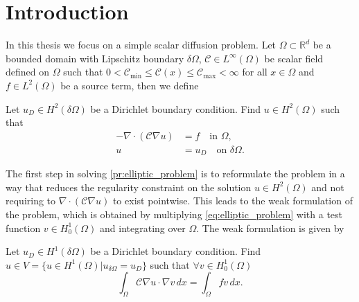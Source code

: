 \chapter{Introduction}\label{ch:introduction}
In this thesis we focus on a simple scalar diffusion problem. Let $\Omega\subset\mathbb{R}^d$ be a bounded domain with Lipschitz boundary $\delta\Omega$, $\mathcal{C}\in L^\infty(\Omega)$ be scalar field defined on $\Omega$ such that $0 < \mathcal{C}_{\min} \leq \mathcal{C}(x) \leq \mathcal{C}_{\max} < \infty$ for all $x\in\Omega$ and $f\in L^2(\Omega)$ be a source term, then we define
\begin{problem}
    Let $u_D\in H^2(\delta\Omega)$ be a Dirichlet boundary condition. Find $u\in H^2(\Omega)$ such that
    \begin{equation}
        \begin{aligned}
            -\nabla\cdot\left(\mathcal{C}\nabla u\right) & = f \quad \text{in } \Omega,           \\
            u                                       & = u_D \quad \text{on } \delta\Omega.
        \end{aligned}
        \label{eq:elliptic_problem}
    \end{equation}
    \label{pr:elliptic_problem}
\end{problem}

The first step in solving \cref{pr:elliptic_problem} is to reformulate the problem in a way that reduces the regularity constraint on the solution $u\in H^2(\Omega)$ and not requiring to $\nabla\cdot\left(\mathcal{C}\nabla u\right)$ to exist pointwise. This leads to the weak formulation of the problem, which is obtained by multiplying \cref{eq:elliptic_problem} with a test function $v\in H^1_0(\Omega)$ and integrating over $\Omega$. The weak formulation is given by
\begin{problem}
    Let $u_D\in H^1(\delta\Omega)$ be a Dirichlet boundary condition. Find $u\in V = \{u\in H^1(\Omega) | u_{\delta \Omega} = u_D\}$ such that $\forall v \in H^1_0(\Omega)$
    \begin{equation}
        \label{eq:galerkin}
        \int_\Omega \mathcal{C}\nabla u\cdot\nabla v\,dx = \int_\Omega f v\,dx.
    \end{equation}
    \label{pr:elliptic_problem_weak}
\end{problem}

